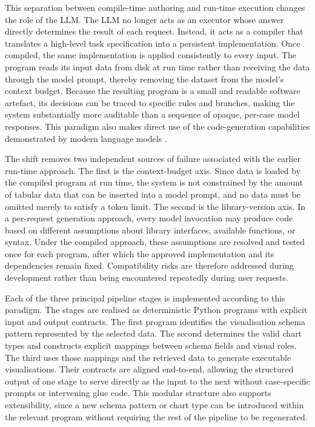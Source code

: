 This separation between compile-time authoring and run-time execution changes the role of the LLM. The LLM no longer acts as an executor whose answer directly determines the result of each request. Instead, it acts as a compiler that translates a high-level task specification into a persistent implementation. Once compiled, the same implementation is applied consistently to every input. The program reads its input data from disk at run time rather than receiving the data through the model prompt, thereby removing the dataset from the model’s context budget. Because the resulting program is a small and readable software artefact, its decisions can be traced to specific rules and branches, making the system substantially more auditable than a sequence of opaque, per-case model responses. This paradigm also makes direct use of the code-generation capabilities demonstrated by modern language models \cite{chen2021evaluating}.

The shift removes two independent sources of failure associated with the earlier run-time approach. The first is the context-budget axis. Since data is loaded by the compiled program at run time, the system is not constrained by the amount of tabular data that can be inserted into a model prompt, and no data must be omitted merely to satisfy a token limit. The second is the library-version axis. In a per-request generation approach, every model invocation may produce code based on different assumptions about library interfaces, available functions, or syntax. Under the compiled approach, these assumptions are resolved and tested once for each program, after which the approved implementation and its dependencies remain fixed. Compatibility risks are therefore addressed during development rather than being encountered repeatedly during user requests.

Each of the three principal pipeline stages is implemented according to this paradigm. The stages are realised as deterministic Python programs with explicit input and output contracts. The first program identifies the visualisation schema pattern represented by the selected data. The second determines the valid chart types and constructs explicit mappings between schema fields and visual roles. The third uses those mappings and the retrieved data to generate executable visualisations. Their contracts are aligned end-to-end, allowing the structured output of one stage to serve directly as the input to the next without case-specific prompts or intervening glue code. This modular structure also supports extensibility, since a new schema pattern or chart type can be introduced within the relevant program without requiring the rest of the pipeline to be regenerated.

